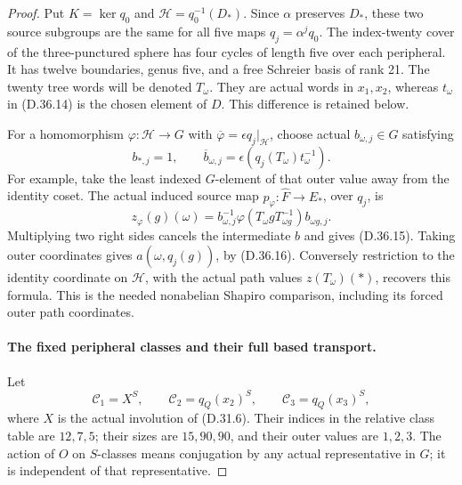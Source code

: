 \begin{proof}
Put \(K=\ker q_0\) and
\(\mathcal H=q_0^{-1}(D_*)\).  Since \(\alpha\) preserves \(D_*\),
these two source subgroups are the same for all five maps
\(q_j=\alpha^jq_0\).  The index-twenty cover of the three-punctured
sphere has four cycles of length five over each peripheral.
It has twelve boundaries, genus five, and a free Schreier basis
of rank 21.  The twenty tree words will be denoted \(T_\omega\).
They are actual words in \(x_1,x_2\), whereas \(t_\omega\)
in \textup{(D.36.14)} is the chosen element of \(D\).
This difference is retained below.

For a homomorphism \(\varphi:\mathcal H\to G\) with
\(\overline\varphi=\epsilon q_j|_{\mathcal H}\), choose actual
\(b_{\omega,j}\in G\) satisfying
\[
 b_{*,j}=1,\qquad
 \overline b_{\omega,j}
       =\epsilon(q_j(T_\omega)t_\omega^{-1}).
 \tag{D.36.16}
\]
For example, take the least indexed \(G\)-element of that outer
value away from the identity coset.  The actual induced source
map \(p_\varphi:\widehat F\to E_*\), over \(q_j\), is
\[
 z_\varphi(g)(\omega)
   =b_{\omega,j}^{-1}
      \varphi(T_\omega gT_{\omega g}^{-1})
      b_{\omega g,j}.
 \tag{D.36.17}
\]
Multiplying two right sides cancels the intermediate \(b\) and
gives \textup{(D.36.15)}.  Taking outer coordinates gives
\(a(\omega,q_j(g))\), by \textup{(D.36.16)}.
Conversely restriction to the identity coordinate on
\(\mathcal H\), with the actual path values \(z(T_\omega)(*)\),
recovers this formula.  This is the needed nonabelian Shapiro
comparison, including its forced outer path coordinates.

\paragraph{The fixed peripheral classes and their full based transport.}
Let
\[
 \mathcal C_1=X^S,\qquad
 \mathcal C_2=q_Q(x_2)^S,\qquad
 \mathcal C_3=q_Q(x_3)^S,
 \tag{D.36.18}
\]
where \(X\) is the actual involution of \textup{(D.31.6)}.
Their indices in the relative class table are \(12,7,5\);
their sizes are \(15,90,90\), and their outer values are \(1,2,3\).
The action of \(O\) on \(S\)-classes means conjugation by any
actual representative in \(G\); it is independent of that
representative.


\end{proof}
